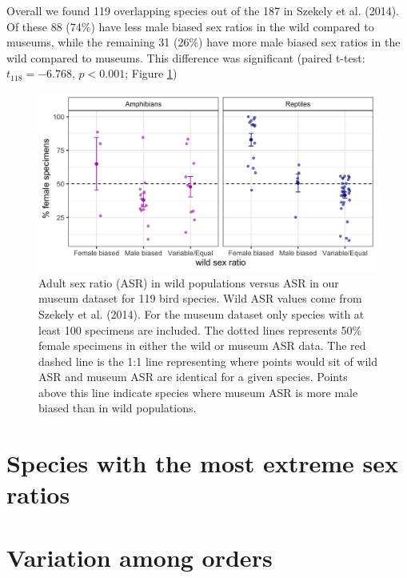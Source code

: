 \documentclass[a4paper, 12pt]{article}
\begin{document}
Overall we found 119 overlapping species out of the 187 in Szekely et al. (2014)\cite{szekely2014sex}.
Of these 88 (74\%) have less male biased sex ratios in the wild compared to museums, while the remaining 31 (26\%) have more male biased sex ratios in the wild compared to museums. 
This difference was significant (paired t-test: $t_{118} = -6.768$, $p < 0.001$; Figure \ref{fig-asr})

\begin{figure}[H]
 \centering
  \includegraphics[width = \linewidth]{figures/wild-sex-ratios.png}
  \caption{Adult sex ratio (ASR) in wild populations versus ASR in our museum dataset for 119 bird species. 
  Wild ASR values come from Szekely et al. (2014)\cite{szekely2014sex}. 
  For the museum dataset only species with at least 100 specimens are included. 
  The dotted lines represents 50\% female specimens in either the wild or museum ASR data. 
  The red dashed line is the 1:1 line representing where points would sit of wild ASR and museum ASR are identical for a given species.
  Points above this line indicate species where museum ASR is more male biased than in wild populations.
}
  \label{fig-asr}
\end{figure}

\newpage
\section{Species with the most extreme sex ratios}


\newpage
\section{Variation among orders}
\end{document}
